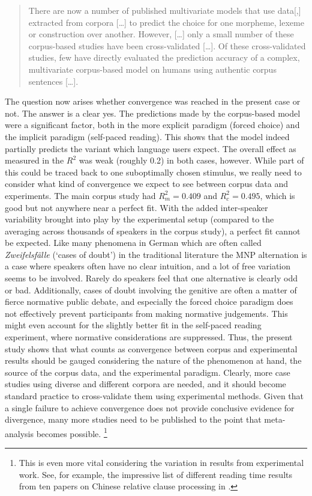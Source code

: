 \begin{quote}
  There are now a number of published multivariate models that use data[,] extracted from corpora [\ldots] to predict the choice for one morpheme, lexeme or construction over another.
  However, [\ldots] only a small number of these corpus-based studies have been cross-validated [\ldots].
  Of these cross-validated studies, few have directly evaluated the prediction accuracy of a complex, multivariate corpus-based model on humans using authentic corpus sentences [\ldots].
\end{quote}

The question now arises whether convergence was reached in the present case or not.
The answer is a clear yes.
The predictions made by the corpus-based model were a significant factor, both in the more explicit paradigm (forced choice) and the implicit paradigm (self-paced reading).
This shows that the model indeed partially predicts the variant which language users expect.
The overall effect as measured in the $R^2$ was weak (roughly 0.2) in both cases, however.
While part of this could be traced back to one suboptimally chosen stimulus, we really need to consider what kind of convergence we expect to see between corpus data and experiments.
The main corpus study had $R^2_m=0.409$ and $R^2_c=0.495$, which is good but not anywhere near a perfect fit.
With the added inter-speaker variability brought into play by the experimental setup (compared to the averaging across thousands of speakers in the corpus study), a perfect fit cannot be expected.
Like many phenomena in German which are often called \textit{Zweifelsfälle} (`cases of doubt') in the traditional literature \citep{Duden09,Klein2009} the MNP alternation is a case where speakers often have no clear intuition, and a lot of free variation seems to be involved.
Rarely do speakers feel that one alternative is clearly odd or bad.
Additionally, cases of doubt involving the genitive are often a matter of fierce normative public debate, and especially the forced choice paradigm does not effectively prevent participants from making normative judgements.
This might even account for the slightly better fit in the self-paced reading experiment, where normative considerations are suppressed.
Thus, the present study shows that what counts as convergence between corpus and experimental results should be gauged considering the nature of the phenomenon at hand, the source of the corpus data, and the experimental paradigm.
Clearly, more case studies using diverse and different corpora are needed, and it should become standard practice to cross-validate them using experimental methods.
Given that a single failure to achieve convergence does not provide conclusive evidence for divergence, many more studies need to be published to the point that meta-analysis becomes possible.%
\footnote{This is even more vital considering the variation in results from experimental work.
See, for example, the impressive list of different reading time results from ten papers on Chinese relative clause processing in \citet[8]{Vasishth2015}.}

